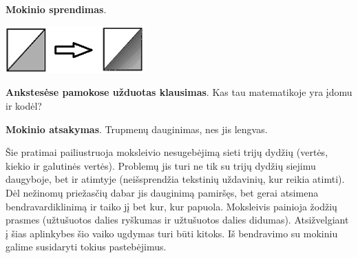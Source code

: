 \documentclass{article}
\begin{document}
\textbf{Mokinio sprendimas}.

\includegraphics[width=0.4\textwidth]{density.png}

\textbf{Ankstesėse pamokose užduotas klausimas}. Kas tau matematikoje yra įdomu ir kodėl?

\textbf{Mokinio atsakymas}. Trupmenų dauginimas, nes jis lengvas.

Šie pratimai pailiustruoja moksleivio nesugebėjimą sieti trijų dydžių (vertės, kiekio ir galutinės vertės). Problemų jis turi ne tik su trijų dydžių siejimu daugyboje, bet ir atimtyje (neišsprendžia tekstinių uždavinių, kur reikia atimti). Dėl nežinomų priežasčių dabar jis dauginimą pamiršęs, bet gerai atsimena bendravardiklinimą ir taiko jį bet kur, kur papuola. Moksleivis painioja žodžių prasmes (užtušuotos dalies ryškumas ir užtušuotos dalies didumas). Atsižvelgiant į šias aplinkybes šio vaiko ugdymas turi būti kitoks. Iš bendravimo su mokiniu galime susidaryti tokius pastebėjimus.
\end{document}
